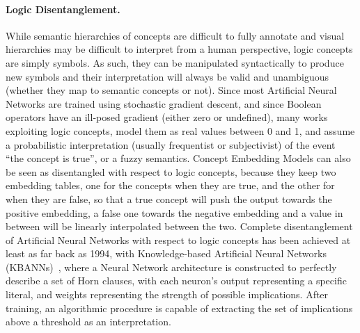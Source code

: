 \paragraph{Logic Disentanglement.} While semantic hierarchies of concepts are difficult to fully annotate and visual hierarchies may be difficult to interpret from a human perspective, logic concepts are simply symbols. As such, they can be manipulated syntactically to produce new symbols and their interpretation will always be valid and unambiguous (whether they map to semantic concepts or not). 
Since most Artificial Neural Networks are trained using stochastic gradient descent, and since Boolean operators have an ill-posed gradient (either zero or undefined), many works exploiting logic concepts, model them as real values between 0 and 1, and assume a probabilistic interpretation (usually frequentist or subjectivist) of the event ``the concept is true'', or a fuzzy semantics. Concept Embedding Models can also be seen as disentangled with respect to logic concepts, because they keep two embedding tables, one for the concepts when they are true, and the other for when they are false, so that a true concept will push the output towards the positive embedding, a false one towards the negative embedding and a value in between will be linearly interpolated between the two.
%
Complete disentanglement of Artificial Neural Networks with respect to logic concepts has been achieved at least as far back as 1994, with Knowledge-based Artificial Neural Networks (KBANNs)~\cite{towell1994knowledge}, where a Neural Network architecture is constructed to perfectly describe a set of Horn clauses, with each neuron's output representing a specific literal, and weights representing the strength of possible implications. After training, an algorithmic procedure is capable of extracting the set of implications above a threshold as an interpretation.

